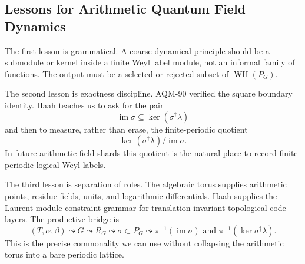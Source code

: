 \subsection{Lessons for Arithmetic Quantum Field Dynamics}

The first lesson is grammatical.  A coarse dynamical principle should be a
submodule or kernel inside a finite Weyl label module, not an informal family
of functions.  The output must be a selected or rejected subset of
\(\operatorname{WH}(P_G)\).

The second lesson is exactness discipline.  AQM-90 verified the square
boundary identity.  Haah teaches us to ask for the pair
\[
  \operatorname{im}\sigma\subseteq\ker(\sigma^\dagger\lambda)
\]
and then to measure, rather than erase, the finite-periodic quotient
\[
  \ker(\sigma^\dagger\lambda)/\operatorname{im}\sigma.
\]
In future arithmetic-field shards this quotient is the natural place to record
finite-periodic logical Weyl labels.

The third lesson is separation of roles.  The algebraic torus supplies
arithmetic points, residue fields, units, and logarithmic differentials.  Haah
supplies the Laurent-module constraint grammar for translation-invariant
topological code layers.  The productive bridge is
\[
  (T,\alpha,\beta)
  \leadsto G
  \leadsto R_G
  \leadsto \sigma\subset P_G
  \leadsto \pi^{-1}(\operatorname{im}\sigma)
  \text{ and }
  \pi^{-1}(\ker\sigma^\dagger\lambda).
\]
This is the precise commonality we can use without collapsing the arithmetic
torus into a bare periodic lattice.
